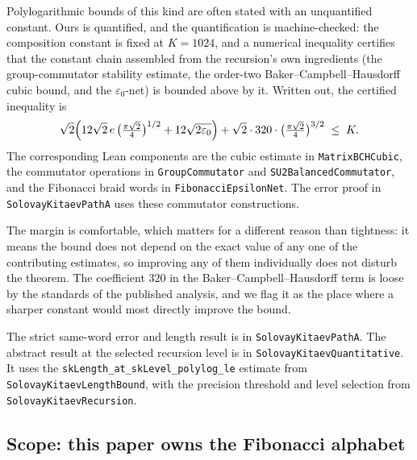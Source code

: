 \documentclass[aps,prx,nofootinbib,superscriptaddress,12pt]{revtex4-2}
\begin{document}
Polylogarithmic bounds of this kind are often stated with an unquantified
constant. Ours is quantified, and the quantification is machine-checked:
the composition constant is fixed at $K = 1024$, and a numerical
inequality certifies that the constant chain assembled from the
recursion's own ingredients (the group-commutator stability estimate,
the order-two Baker--Campbell--Hausdorff cubic bound, and the
$\varepsilon_0$-net) is bounded above by it. Written out, the
certified inequality is
\[
\sqrt2\Bigl(12\sqrt2\,e\,\bigl(\tfrac{\pi\sqrt2}{4}\bigr)^{1/2}
 + 12\sqrt{2\varepsilon_0}\Bigr)
+ \sqrt2 \cdot 320 \cdot \bigl(\tfrac{\pi\sqrt2}{4}\bigr)^{3/2}
\;\le\; K .
\]
The corresponding Lean components are the cubic estimate in
\texttt{MatrixBCHCubic}, the commutator operations in
\texttt{GroupCommutator} and \texttt{SU2BalancedCommutator}, and the
Fibonacci braid words in \texttt{FibonacciEpsilonNet}. The error proof in
\texttt{SolovayKitaevPathA} uses these commutator constructions.

The margin is comfortable, which matters for a different reason than
tightness: it means the bound does not depend on the exact value of any
one of the contributing estimates, so improving any of them individually
does not disturb the theorem. The coefficient $320$ in the
Baker--Campbell--Hausdorff term is loose by the standards of the
published analysis, and we flag it as the place where a sharper constant
would most directly improve the bound.


The strict same-word error and length result is in
\texttt{SolovayKitaevPathA}. The abstract result at the selected recursion
level is in \texttt{SolovayKitaevQuantitative}. It uses the
\texttt{skLength\_at\_skLevel\_polylog\_le} estimate from
\texttt{SolovayKitaevLengthBound}, with the precision threshold and level
selection from \texttt{SolovayKitaevRecursion}.

\subsection{Scope: this paper owns the Fibonacci alphabet}
\end{document}
